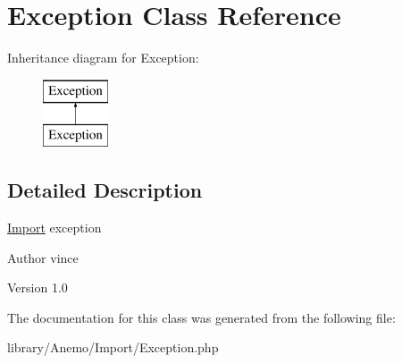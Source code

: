 \hypertarget{class_anemo_1_1_import_1_1_exception}{
\section{Exception Class Reference}
\label{class_anemo_1_1_import_1_1_exception}
}
Inheritance diagram for Exception:\begin{figure}[H]
\begin{center}
\leavevmode
\includegraphics[height=2.000000cm]{class_anemo_1_1_import_1_1_exception}
\end{center}
\end{figure}


\subsection{Detailed Description}
\hyperlink{class_anemo_1_1_import}{Import} exception \begin{DoxyAuthor}{Author}
vince 
\end{DoxyAuthor}
\begin{DoxyVersion}{Version}
1.0 
\end{DoxyVersion}


The documentation for this class was generated from the following file:\begin{DoxyCompactItemize}
\item 
library/Anemo/Import/Exception.php\end{DoxyCompactItemize}
